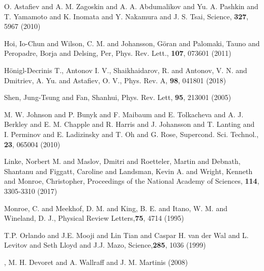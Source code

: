 
\begin{thebibliography}{99}

 O.  Astafiev  and A.  M.  Zagoskin  and A.  A.  Abdumalikov  and Yu. A.
  Pashkin  and T.   Yamamoto and  K.  Inomata  and  Y.  Nakamura  and J.   S.  Tsai,  Science,
  \textbf{327}, 5967 (2010)

 Hoi, Io-Chun and Wilson, C.   M.  and Johansson, G\"oran and Palomaki, Tauno
  and Peropadre, Borja and Delsing, Per, Phys. Rev.  Lett., \textbf{107}, 073601 (2011)

 H\"onigl-Decrinis T., Antonov I.   V., Shaikhaidarov, R.  and Antonov, V.
  N.  and Dmitriev, A.  Yu.  and Astafiev, O.  V., Phys.  Rev.  A, \textbf{98}, 041801 (2018)

 Shen, Jung-Tsung  and Fan, Shanhui, Phys.  Rev.   Lett, \textbf{95}, 213001
  (2005)

 {M.  W.  Johnson and P.  Bunyk  and F.  Maibaum and E. Tolkacheva and A.
    J.  Berkley and  E.  M.  Chapple and R.   Harris and J.  Johansson and T.   Lanting and I.
    Perminov  and E.   Ladizinsky  and T.   Oh  and G.   Rose},  {Supercond. Sci.   Technol.},
  \textbf{23}, {065004} (2010)
  
 Linke,  Norbert M. and Maslov,  Dmitri and Roetteler, Martin  and Debnath,
  Shantanu  and Figgatt,  Caroline and  Landsman, Kevin  A.  and  Wright, Kenneth  and Monroe,
  Christopher, Proceedings of the National Academy of Sciences, \textbf{114}, 3305-3310 (2017)

        
    
 {Monroe, C.  and Meekhof, D.  M.  and  King, B. E. and Itano, W.  M.  and
    Wineland, D.  J.}, {Physical Review Letters},\textbf{75}, 4714 (1995)

 {T.P. Orlando and J.E. Mooji and Lin  Tian and Caspar H. van der Wal and
    L. Levitov and Seth Lloyd and J.J. Mazo}, {Science},\textbf{285}, {1036} (1999)

, {M. H. Devoret and A. Wallraff and J. M. Martinis} (2008)


\end{thebibliography}
